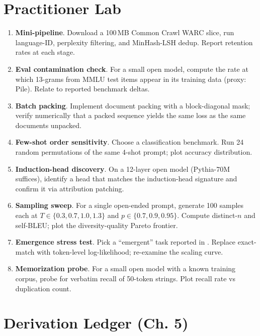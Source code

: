 \section{Practitioner Lab}

\begin{enumerate}
  \item \textbf{Mini-pipeline}. Download a 100\,MB Common Crawl WARC
        slice, run language-ID, perplexity filtering, and MinHash-LSH
        dedup. Report retention rates at each stage.
  \item \textbf{Eval contamination check}. For a small open model,
        compute the rate at which 13-grams from MMLU test items
        appear in its training data (proxy: Pile). Relate to
        reported benchmark deltas.
  \item \textbf{Batch packing}. Implement document packing with a
        block-diagonal mask; verify numerically that a packed
        sequence yields the same loss as the same documents unpacked.
  \item \textbf{Few-shot order sensitivity}. Choose a classification
        benchmark. Run 24 random permutations of the same 4-shot
        prompt; plot accuracy distribution.
  \item \textbf{Induction-head discovery}. On a 12-layer open model
        (Pythia-70M suffices), identify a head that matches the
        induction-head signature and confirm it via attribution
        patching.
  \item \textbf{Sampling sweep}. For a single open-ended prompt,
        generate 100 samples each at $T \in \{0.3, 0.7, 1.0, 1.3\}$
        and $p \in \{0.7, 0.9, 0.95\}$. Compute distinct-$n$ and
        self-BLEU; plot the diversity-quality Pareto frontier.
  \item \textbf{Emergence stress test}. Pick a ``emergent'' task
        reported in \citet{wei2022emergent}. Replace exact-match with
        token-level log-likelihood; re-examine the scaling curve.
  \item \textbf{Memorization probe}. For a small open model with a
        known training corpus, probe for verbatim recall of 50-token
        strings. Plot recall rate vs duplication count.
\end{enumerate}

\section*{Derivation Ledger (Ch. 5)}


